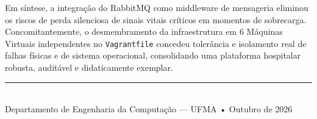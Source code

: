 \documentclass[11pt,a4paper]{article}
\begin{document}
Em síntese, a integração do RabbitMQ como middleware de mensageria eliminou os riscos de perda silenciosa de sinais vitais críticos em momentos de sobrecarga. Concomitantemente, o desmembramento da infraestrutura em 6 Máquinas Virtuais independentes no \texttt{Vagrantfile} concedeu tolerância e isolamento real de falhas físicas e de sistema operacional, consolidando uma plataforma hospitalar robusta, auditável e didaticamente exemplar.

\vspace{0.4cm}
\begin{center}
    \rule{0.35\linewidth}{0.4pt}\\[4pt]
    {\footnotesize Departamento de Engenharia da Computação — UFMA • Outubro de 2026}
\end{center}
\end{document}
